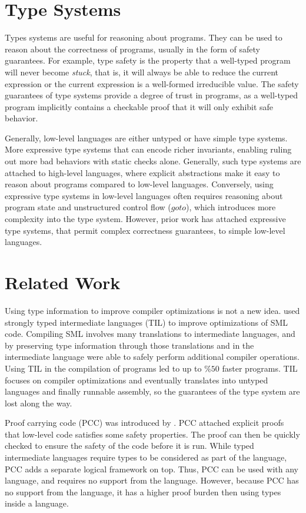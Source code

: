 \section{Type Systems}
Types systems are useful for reasoning about programs.
They can be used to reason about the correctness of programs, usually in the form of safety guarantees.
For example, type safety is the property that a well-typed program will never become \emph{stuck}, that is, it will always be able to reduce the current expression or the current expression is a well-formed irreducible value.
The safety guarantees of type systems provide a degree of trust in programs, as a well-typed program implicitly contains a checkable proof that it will only exhibit safe behavior.

Generally, low-level languages are either untyped or have simple type systems.
More expressive type systems that can encode richer invariants, enabling ruling out more bad behaviors with static checks alone.
Generally, such type systems are attached to high-level languages, where explicit abstractions make it easy to reason about programs compared to low-level languages.
Conversely, using expressive type systems in low-level languages often requires reasoning about program state and unstructured control flow (\ie $goto$), which introduces more complexity into the type system.
However, prior work has attached expressive type systems, that permit complex correctness guarantees, to simple low-level languages.

\section{Related Work}
\label{sec:relwork}
Using type information to improve compiler optimizations is not a new idea.
\citet{TIL} used strongly typed intermediate languages (TIL) to improve optimizations of SML code.
Compiling SML involves many translations to intermediate languages, and by preserving type information through those translations and in the intermediate language \citet{TIL} were able to safely perform additional compiler operations.
Using TIL in the compilation of programs led to up to $\%50$ faster programs.
TIL focuses on compiler optimizations and eventually translates into untyped languages and finally runnable assembly, so the guarantees of the type system are lost along the way.

Proof carrying code (PCC) was introduced by \citet{PCC}.
PCC attached explicit proofs that low-level code satisfies some safety properties.
The proof can then be quickly checked to ensure the safety of the code before it is run.
While typed intermediate languages require types to be considered as part of the language, PCC adds a separate logical framework on top.
Thus, PCC can be used with any language, and requires no support from the language.
However, because PCC has no support from the language, it has a higher proof burden then using types inside a language.

